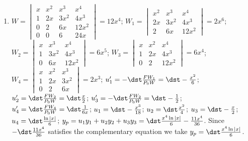 \documentclass[openany]{book}
\newenvironment{sectionSolutions}{
 \begin{enumerate}[item-label={\thesection.\arabic{enumi}.}]
}{
 \end{enumerate}
}
\begin{document}
\begin{sectionSolutions}
\item
$W=\begin{vmatrix}x&x^2&x^3&x^4\\
1&2x&3x^2&4x^3\\0&2&6x&12x^2\\0&0&6&24x
\end{vmatrix}=12x^4$;
$W_1=\begin{vmatrix}x^2&x^3&x^4\\
2x&3x^2&4x^3\\2&6x&12x^2\end{vmatrix}=2x^6$;
$W_2=\begin{vmatrix}x&x^3&x^4\\
1&3x^2&4x^3\\0&6x&12x^2\end{vmatrix}=6x^5$;
$W_3=\begin{vmatrix}x&x^2&x^4\\
1&2x&4x^3\\0&2&12x^2\end{vmatrix}=6x^4$;
$W_4=\begin{vmatrix}x&x^2&x^3\\
1&2x&3x^2\\0&2&6x\end{vmatrix}=2x^3$;
$u_1'=-\dst\frac{FW_1}{ P_0W}=\dst-\frac{x^2}{ 6}$;
$u_2'=\dst\frac{FW_2}{ P_0W}=\dst\frac{x}{ 2}$;
$u_3'=-\dst\frac{FW_2}{ P_0W}=\dst-\frac{1}{ 2}$;
$u_4'=\dst\frac{FW_4}{ P_0W}=\dst\frac{1}{ 6x}$;
$u_1=\dst-\frac{x^3}{ 18}$;
$u_2=\dst\frac{x^2}{ 4}$;
$u_3=\dst-\frac{x}{ 2}$;
$u_4=\dst\frac{\ln|x|}{ 6}$;
$y_p=u_1y_1+u_2y_2+u_3y_3=\dst
\frac{x^4\ln|x|}{ 6}-\frac{11x^4}{ 36}$.
Since $-\dst\frac{11x^4}{ 36}$ satisfies the complementary equation we
take
$y_p=\dst\frac{x^4\ln|x|}{ 6}$.



\end{sectionSolutions}
\end{document}
